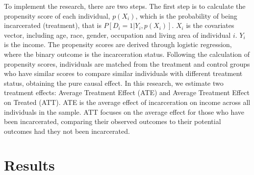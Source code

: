 \documentclass{article}[12pt]
\begin{document}
To implement the research, there are two steps. The first step is to calculate the propensity score of each individual, $p(X_i)$, which is the probability of being incarcerated (treatment), that is $P[D_i=1|Y_{i}, p(X_i)]$. $X_i$ is the covariates vector, including age, race, gender, occupation and living area of individual $i$. $Y_i$ is the income. The propensity scores are derived through logistic regression, where the binary outcome is the incarceration status. Following the calculation of propensity scores, individuals are matched from the treatment and control groups who have similar scores to compare similar individuals with different treatment status, obtaining the pure causal effect. In this research, we estimate two treatment effects: Average Treatment Effect (ATE) and Average Treatment Effect on Treated (ATT). ATE is the average effect of incarceration on income across all individuals in the sample. ATT focuses on the average effect for those who have been incarcerated, comparing their observed outcomes to their potential outcomes had they not been incarcerated. 
\par



\section{Results} %
\end{document}
